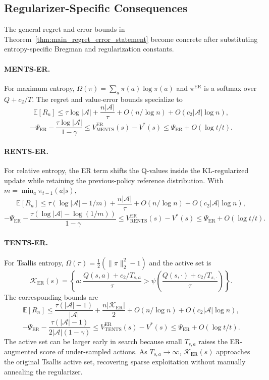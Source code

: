 \documentclass{article}
\newcommand{\E}{\mathbb{E}}
\begin{document}
\subsection{Regularizer-Specific Consequences}
\label{sec:main_regularizer_consequences}
The general regret and error bounds in Theorem~\ref{thm:main_regret_error_statement} become concrete after substituting entropy-specific Bregman and regularization constants.

\paragraph{MENTS-ER.}
For maximum entropy, $\Omega(\pi)=\sum_a\pi(a)\log\pi(a)$ and $\pi^{\mathrm{ER}}$ is a softmax over $Q+c_2/T$.  The regret and value-error bounds specialize to
\[
\E[R_n]\leq \tau\log|\mathcal A|+\frac{n|\mathcal A|}{\tau}+O(n/\log n)+O(c_2|\mathcal A|\log n),
\]
\[
-\Psi_{\mathrm{ER}}-\frac{\tau\log|\mathcal A|}{1-\gamma}
\leq V_{\mathrm{MENTS}}^{\mathrm{ER}}(s)-V^*(s)
\leq \Psi_{\mathrm{ER}}+O(\log t/t).
\]

\paragraph{RENTS-ER.}
For relative entropy, the ER term shifts the Q-values inside the KL-regularized update while retaining the previous-policy reference distribution.  With $m=\min_a\pi_{t-1}(a|s)$,
\[
\E[R_n]\leq \tau(\log|\mathcal A|-1/m)+\frac{n|\mathcal A|}{\tau}+O(n/\log n)+O(c_2|\mathcal A|\log n),
\]
\[
-\Psi_{\mathrm{ER}}-\frac{\tau(\log|\mathcal A|-\log(1/m))}{1-\gamma}
\leq V_{\mathrm{RENTS}}^{\mathrm{ER}}(s)-V^*(s)
\leq \Psi_{\mathrm{ER}}+O(\log t/t).
\]

\paragraph{TENTS-ER.}
For Tsallis entropy, $\Omega(\pi)=\frac12(\|\pi\|_2^2-1)$ and the active set is
\[
\mathcal K_{\mathrm{ER}}(s)=\left\{a:\frac{Q(s,a)+c_2/T_{s,a}}{\tau}>\psi\left(\frac{Q(s,\cdot)+c_2/T_{s,\cdot}}{\tau}\right)\right\}.
\]
The corresponding bounds are
\[
\E[R_n]\leq \frac{\tau(|\mathcal A|-1)}{|\mathcal A|}+\frac{n|\mathcal K_{\mathrm{ER}}|}{2}+O(n/\log n)+O(c_2|\mathcal A|\log n),
\]
\[
-\Psi_{\mathrm{ER}}-\frac{\tau(|\mathcal A|-1)}{2|\mathcal A|(1-\gamma)}
\leq V_{\mathrm{TENTS}}^{\mathrm{ER}}(s)-V^*(s)
\leq \Psi_{\mathrm{ER}}+O(\log t/t).
\]
The active set can be larger early in search because small $T_{s,a}$ raises the ER-augmented score of under-sampled actions.  As $T_{s,a}\to\infty$, $\mathcal K_{\mathrm{ER}}(s)$ approaches the original Tsallis active set, recovering sparse exploitation without manually annealing the regularizer.
\end{document}
